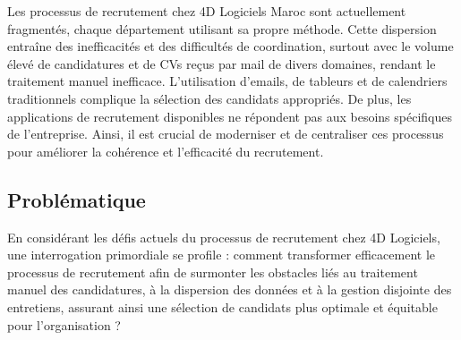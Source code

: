 Les processus de recrutement chez 4D Logiciels Maroc sont 
actuellement fragmentés, chaque département utilisant sa propre 
méthode. Cette dispersion entraîne des inefficacités et des 
difficultés de coordination, surtout avec le volume élevé de 
candidatures et de CVs reçus par mail de divers domaines, rendant le traitement 
manuel inefficace. L'utilisation d'emails, de tableurs et de 
calendriers traditionnels complique la sélection des candidats 
appropriés. De plus, les applications de recrutement disponibles 
ne répondent pas aux besoins spécifiques de l'entreprise. Ainsi, 
il est crucial de moderniser et de centraliser ces processus 
pour améliorer la cohérence et l'efficacité du recrutement.

\subsection{Problématique}

En considérant les défis actuels du processus de recrutement chez
 4D Logiciels, une interrogation primordiale se profile : 
 comment transformer efficacement le processus de recrutement 
 afin de surmonter les obstacles liés au traitement manuel des 
 candidatures, à la dispersion des données et à la gestion 
 disjointe des entretiens, assurant ainsi une sélection de 
 candidats plus optimale et équitable pour l'organisation ?

